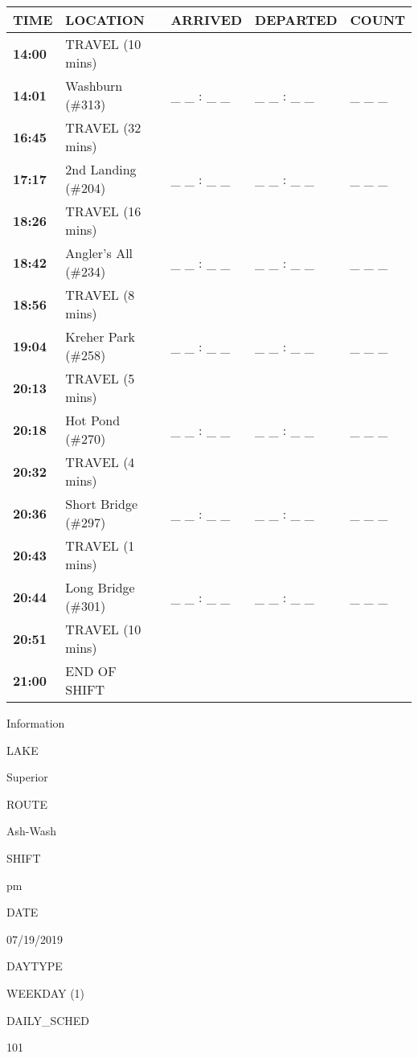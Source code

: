 \documentclass[]{article}
\begin{document}
\begin{tabular}{>{\bfseries}lllll}
\toprule
\textbf{TIME} & \textbf{LOCATION} & \textbf{ARRIVED} & \textbf{DEPARTED} & \textbf{COUNT}\\
\midrule
14:00 & TRAVEL (10 mins) &  &  & \\
14:01 & Washburn (\#313) & \_ \_ : \_ \_ & \_ \_ : \_ \_ & \_ \_ \_\\
16:45 & TRAVEL (32 mins) &  &  & \\
17:17 & 2nd Landing (\#204) & \_ \_ : \_ \_ & \_ \_ : \_ \_ & \_ \_ \_\\
18:26 & TRAVEL (16 mins) &  &  & \\
18:42 & Angler's All (\#234) & \_ \_ : \_ \_ & \_ \_ : \_ \_ & \_ \_ \_\\
18:56 & TRAVEL (8 mins) &  &  & \\
19:04 & Kreher Park (\#258) & \_ \_ : \_ \_ & \_ \_ : \_ \_ & \_ \_ \_\\
20:13 & TRAVEL (5 mins) &  &  & \\
20:18 & Hot Pond (\#270) & \_ \_ : \_ \_ & \_ \_ : \_ \_ & \_ \_ \_\\
20:32 & TRAVEL (4 mins) &  &  & \\
20:36 & Short Bridge (\#297) & \_ \_ : \_ \_ & \_ \_ : \_ \_ & \_ \_ \_\\
20:43 & TRAVEL (1 mins) &  &  & \\
20:44 & Long Bridge (\#301) & \_ \_ : \_ \_ & \_ \_ : \_ \_ & \_ \_ \_\\
20:51 & TRAVEL (10 mins) &  &  & \\
21:00 & END OF SHIFT &  &  & \\
\bottomrule
\end{tabular}\newpage

Information

LAKE

Superior

ROUTE

Ash-Wash

SHIFT

pm

DATE

07/19/2019

DAYTYPE

WEEKDAY (1)

DAILY\_SCHED

101

\vspace{24pt}
\end{document}
